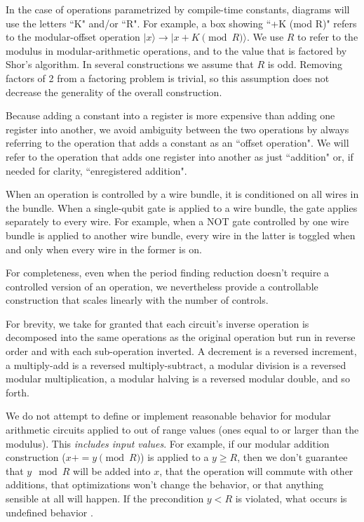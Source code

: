 \documentclass[twocolumn,longbibliography]{quantumarticle-customized}
\begin{document}
In the case of operations parametrized by compile-time constants, diagrams will use the letters ``K" and/or ``R".
For example, a box showing ``+K (mod R)" refers to the modular-offset operation $|x\rangle \rightarrow |x+K \pmod{R}\rangle$.
We use $R$ to refer to the modulus in modular-arithmetic operations, and to the value that is factored by Shor's algorithm.
In several constructions we assume that $R$ is odd.
Removing factors of 2 from a factoring problem is trivial, so this assumption does not decrease the generality of the overall construction.

Because adding a constant into a register is more expensive than adding one register into another, we avoid ambiguity between the two operations by always referring to the operation that adds a constant as an ``offset operation".
We will refer to the operation that adds one register into another as just ``addition" or, if needed for clarity, ``enregistered addition".

When an operation is controlled by a wire bundle, it is conditioned on all wires in the bundle.
When a single-qubit gate is applied to a wire bundle, the gate applies separately to every wire.
For example, when a NOT gate controlled by one wire bundle is applied to another wire bundle, every wire in the latter is toggled when and only when every wire in the former is on.

For completeness, even when the period finding reduction doesn't require a controlled version of an operation, we nevertheless provide a controllable construction that scales linearly with the number of controls.

For brevity, we take for granted that each circuit's inverse operation is decomposed into the same operations as the original operation but run in reverse order and with each sub-operation inverted.
A decrement is a reversed increment, a multiply-add is a reversed multiply-subtract, a modular division is a reversed modular multiplication, a modular halving is a reversed modular double, and so forth.

We do not attempt to define or implement reasonable behavior for modular arithmetic circuits applied to out of range values (ones equal to or larger than the modulus).
This {\em includes input values}.
For example, if our modular addition construction ($x \mathrel{{+}{=}} y \pmod{R}$) is applied to a $y \geq R$, then we don't guarantee that $y \mod R$ will be added into $x$, that the operation will commute with other additions, that optimizations won't change the behavior, or that anything sensible at all will happen.
If the precondition $y < R$ is violated, what occurs is undefined behavior \cite{c11}.
\end{document}
